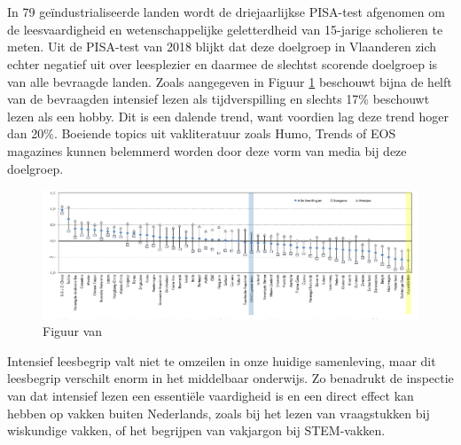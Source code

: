 \section{}%
\label{sec:probleemstelling}

In 79 geïndustrialiseerde landen wordt de driejaarlijkse PISA-test afgenomen om de leesvaardigheid en wetenschappelijke geletterdheid van 15-jarige scholieren te meten. Uit de PISA-test van 2018 blijkt dat deze doelgroep in Vlaanderen zich echter negatief uit over leesplezier en daarmee de slechtst scorende doelgroep is van alle bevraagde landen. Zoals aangegeven in Figuur \ref{img:oeso-leesplezier} beschouwt bijna de helft van de bevraagden intensief lezen als tijdverspilling en slechts 17\% beschouwt lezen als een hobby. Dit is een dalende trend, want voordien lag deze trend hoger dan 20\%. Boeiende topics uit vakliteratuur zoals Humo, Trends of EOS magazines kunnen belemmerd worden door deze vorm van media bij deze doelgroep.

\begin{figure}[H]
	\begin{center}
		\includegraphics[width=\linewidth]{img/oeso-graphic-leesplezier.png}
	\end{center}
	\caption{Figuur van \textcite{DeMeyer2019}}
	\label{img:oeso-leesplezier}
\end{figure}

\medspace


Intensief leesbegrip valt niet te omzeilen in onze huidige samenleving, maar dit leesbegrip verschilt enorm in het middelbaar onderwijs. Zo benadrukt de inspectie van \textcite{Vlaanderen2020} dat intensief lezen een essentiële vaardigheid is en een direct effect kan hebben op vakken buiten Nederlands, zoals bij het lezen van vraagstukken bij wiskundige vakken, of het begrijpen van vakjargon bij STEM-vakken. 

\medspace 

